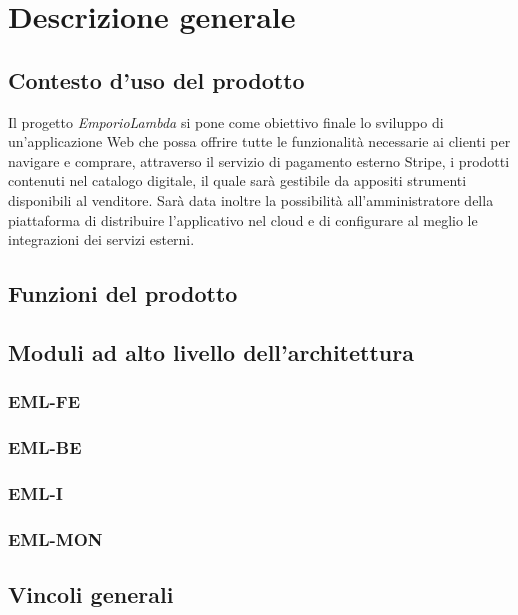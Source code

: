 \section{Descrizione generale}
\subsection{Contesto d'uso del prodotto}
Il progetto \textit{EmporioLambda} si pone come obiettivo finale lo sviluppo di un'applicazione Web che possa offrire tutte le funzionalità necessarie ai clienti per navigare e comprare, attraverso il servizio di pagamento esterno Stripe, i prodotti contenuti nel catalogo digitale, il quale sarà gestibile da appositi strumenti disponibili al venditore. Sarà data inoltre la possibilità all'amministratore della piattaforma di distribuire l'applicativo nel cloud e di configurare al meglio le integrazioni dei servizi esterni.
\subsection{Funzioni del prodotto}

\subsection{Moduli ad alto livello dell'architettura}
\subsubsection{EML-FE}
\subsubsection{EML-BE}
\subsubsection{EML-I}
\subsubsection{EML-MON}
\subsection{Vincoli generali}